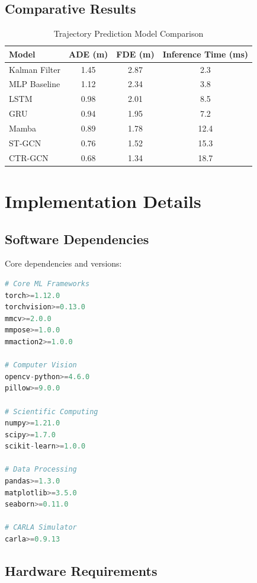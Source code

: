 \documentclass[11pt,a4paper]{article}
\begin{document}
\subsection{Comparative Results}

\begin{table}[h]
\centering
\caption{Trajectory Prediction Model Comparison}
\begin{tabular}{lccc}
\toprule
\textbf{Model} & \textbf{ADE (m)} & \textbf{FDE (m)} & \textbf{Inference Time (ms)} \\
\midrule
Kalman Filter & 1.45 & 2.87 & 2.3 \\
MLP Baseline & 1.12 & 2.34 & 3.8 \\
LSTM & 0.98 & 2.01 & 8.5 \\
GRU & 0.94 & 1.95 & 7.2 \\
Mamba & 0.89 & 1.78 & 12.4 \\
ST-GCN & 0.76 & 1.52 & 15.3 \\
CTR-GCN & 0.68 & 1.34 & 18.7 \\
\bottomrule
\end{tabular}
\end{table}

\section{Implementation Details}

\subsection{Software Dependencies}

Core dependencies and versions:

\begin{lstlisting}[language=Python, caption=Python Requirements]
# Core ML Frameworks
torch>=1.12.0
torchvision>=0.13.0
mmcv>=2.0.0
mmpose>=1.0.0
mmaction2>=1.0.0

# Computer Vision
opencv-python>=4.6.0
pillow>=9.0.0

# Scientific Computing
numpy>=1.21.0
scipy>=1.7.0
scikit-learn>=1.0.0

# Data Processing
pandas>=1.3.0
matplotlib>=3.5.0
seaborn>=0.11.0

# CARLA Simulator
carla>=0.9.13
\end{lstlisting}

\subsection{Hardware Requirements}
\end{document}
